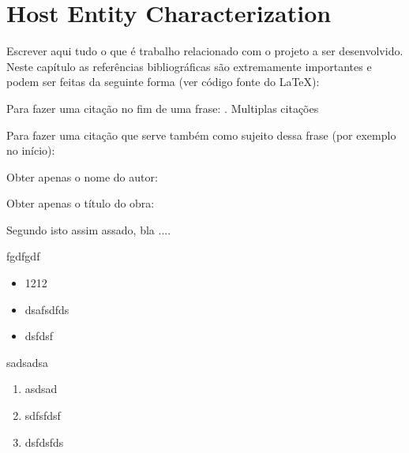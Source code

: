 
\chapter{Host Entity Characterization}
\label{ch:background}



\pagebreak

Escrever aqui tudo o que é trabalho relacionado com o projeto a ser desenvolvido. Neste capítulo as referências bibliográficas são extremamente importantes e podem ser feitas da seguinte forma (ver código fonte do \LaTeX): 

Para fazer uma citação no fim de uma frase: \parencite{Sims1992}. Multiplas citações \parencite{Darwin1859,Koza1992}

Para fazer uma citação que serve também como sujeito dessa frase (por exemplo no início): \textcite{Sims1992}

Obter apenas o nome do autor: \citeauthor{Sims1992}

Obter apenas o título do obra:  


Segundo \textcite{Rudolph2016} isto assim assado, bla .... 


fgdfgdf
\begin{itemize}
    \item 1212
    \item dsafsdfds
    \item dsfdsf
\end{itemize}

sadsadsa
\begin{enumerate}
    \item asdsad
    \item sdfsfdsf
    \item dsfdsfds
\end{enumerate}

